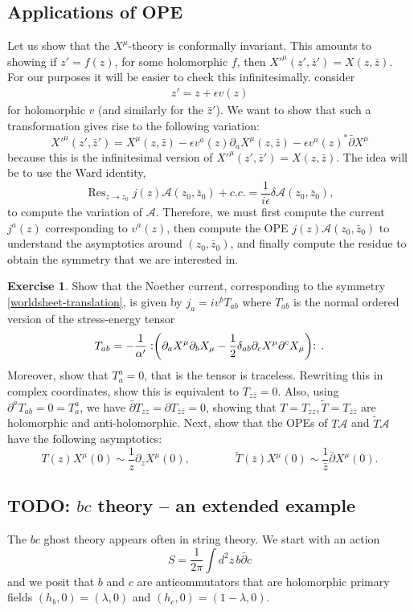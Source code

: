 \documentclass{report}
\theoremstyle{plain}
\theoremstyle{definition}
\newtheorem{exercise}{Exercise}[section]
\theoremstyle{remark}
\newcommand{\FR}[2]{\frac{#1}{#2}}
\newcommand{\ms}{\mathscr}
\newcommand{\di}{\partial}
\newcommand{\delbar}{\bar\partial}
\newcommand{\NO}[1]{\vcentcolon\mathrel{#1}\vcentcolon\,}
\DeclareMathOperator{\Res}{Res}
\begin{document}
\subsection{Applications of OPE}
Let us show that the $X^\mu$-theory is conformally invariant. This amounts
to showing if $z'=f(z)$, for some holomorphic $f$, then $X'^\mu(z',\bar z')
= X(z,\bar z)$. For our purposes it will be easier to check this
infinitesimally. consider 
\begin{align} z' = z+\epsilon v(z)
\label{worldsheet-translation}
\end{align}
for holomorphic $v$ (and similarly for the $\bar z'$).
We want to show that such a transformation gives rise to the following variation:
\[X'^\mu(z',\bar z')=X^\mu(z,\bar z)-\epsilon v^a(z)\di_a X^\mu(z,\bar
z) - \epsilon v^a(z)^* \bar\di X^\mu\]
because this is the infinitesimal version of $X'^\mu(z',\bar z')
= X(z,\bar z)$. The idea will be to use the Ward identity,
\[ \Res_{z \to z_0} j(z) \ms A(z_0,\bar z_0) + c.c. =
\FR{1}{i\epsilon}\delta \ms A(z_0,\bar z_0),\] to compute the variation of
$\ms A$. Therefore, we must first compute the current $j^a(z)$
corresponding to $v^a(z)$, then compute the OPE $j(z)\ms A(z_0,\bar z_0)$
to understand the asymptotics around $(z_0,\bar z_0)$, and finally compute
the residue to obtain the symmetry that we are interested in.

\begin{exercise} Show that the Noether current, corresponding to the
symmetry \eqref{worldsheet-translation}, is given by $j_a = iv^b T_{ab}$
where $T_{ab}$ is the normal ordered version of the stress-energy
tensor \[T_{ab} = -\FR{1}{\alpha'} \NO{ \left( \di_a X^\mu\di_b
X_\mu - \FR{1}{2}\delta_{ab}\di_c X^\mu\di^c X_\mu \right)}.\]
Moreover, show that $T_a^a = 0$, that is the tensor is traceless. Rewriting
this in complex coordinates, show this is equivalent to $T_{z\bar z} = 0$.
Also, using $\di^aT_{ab} = 0 = T^a_a$, we have $\bar\di T_{zz} = \di
T_{\bar z\bar z} = 0$, showing that $T = T_{zz}, \tilde T = T_{\bar z\bar
z}$ are holomorphic and anti-holomorphic. Next, show that the OPEs of $T\ms
A$ and $\tilde T\ms A$ have the following asymptotics:
\[ T(z) X^\mu(0) \sim \FR{1}{z} \di_zX^\mu(0), \qquad\qquad 
\tilde T(\bar z)X^\mu(0) \sim \FR{1}{\bar z}\bar\di X^\mu(0).\]
\end{exercise}
\subsection{TODO: $bc$ theory -- an extended example}
The $bc$ ghost theory appears often in string theory.
We start with an action
\[ S = \FR{1}{2\pi} \int d^2 z\, b\delbar c\]
and we posit that $b$ and $c$ are anticommutators that are holomorphic
primary fields $(h_b,0) = (\lambda,0)$ and $(h_c,0) = (1-\lambda,0)$.
\end{document}

